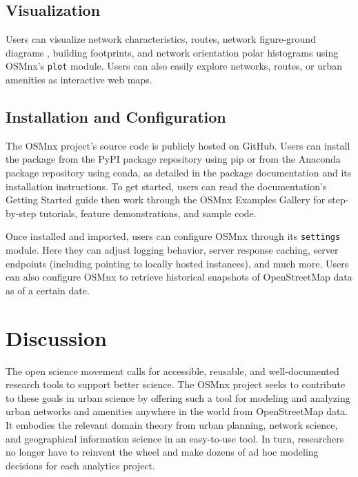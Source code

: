 \documentclass[12pt,letterpaper]{article} %
\begin{document}
\subsection{Visualization}

Users can visualize network characteristics, routes, network figure-ground diagrams \citep{boeing_spatial_2021}, building footprints, and network orientation polar histograms \citep{boeing_urban_2019} using OSMnx's \texttt{plot} module. Users can also easily explore networks, routes, or urban amenities as interactive web maps.

\subsection{Installation and Configuration}

The OSMnx project's source code is publicly hosted on GitHub. Users can install the package from the PyPI package repository using pip or from the Anaconda package repository using conda, as detailed in the package documentation and its installation instructions. To get started, users can read the documentation's Getting Started guide then work through the OSMnx Examples Gallery for step-by-step tutorials, feature demonstrations, and sample code.

Once installed and imported, users can configure OSMnx through its \texttt{settings} module. Here they can adjust logging behavior, server response caching, server endpoints (including pointing to locally hosted instances), and much more. Users can also configure OSMnx to retrieve historical snapshots of OpenStreetMap data as of a certain date.

\section{Discussion}

The open science movement calls for accessible, reusable, and well-documented research tools to support better science. The OSMnx project seeks to contribute to these goals in urban science by offering such a tool for modeling and analyzing urban networks and amenities anywhere in the world from OpenStreetMap data. It embodies the relevant domain theory from urban planning, network science, and geographical information science in an easy-to-use tool. In turn, researchers no longer have to reinvent the wheel and make dozens of ad hoc modeling decisions for each analytics project.
\end{document}

